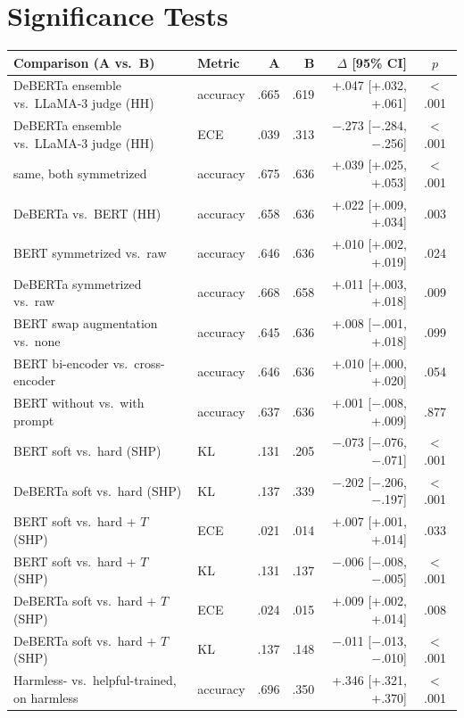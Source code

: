 \documentclass[11pt]{article}
\begin{document}
\section{Significance Tests}
\label{app:significance}

\begin{table}[t]
\centering
\small
\begin{tabular}{llrrrc}
\toprule
Comparison (A vs.\ B) & Metric & A & B & $\Delta$ [95\% CI] & $p$ \\
\midrule
DeBERTa ensemble vs.\ LLaMA-3 judge (HH) & accuracy & .665 & .619 & +.047 [+.032, +.061] & $<$.001 \\
DeBERTa ensemble vs.\ LLaMA-3 judge (HH) & ECE & .039 & .313 & $-$.273 [$-$.284, $-$.256] & $<$.001 \\
same, both symmetrized & accuracy & .675 & .636 & +.039 [+.025, +.053] & $<$.001 \\
DeBERTa vs.\ BERT (HH) & accuracy & .658 & .636 & +.022 [+.009, +.034] & .003 \\
BERT symmetrized vs.\ raw & accuracy & .646 & .636 & +.010 [+.002, +.019] & .024 \\
DeBERTa symmetrized vs.\ raw & accuracy & .668 & .658 & +.011 [+.003, +.018] & .009 \\
BERT swap augmentation vs.\ none & accuracy & .645 & .636 & +.008 [$-$.001, +.018] & .099 \\
BERT bi-encoder vs.\ cross-encoder & accuracy & .646 & .636 & +.010 [+.000, +.020] & .054 \\
BERT without vs.\ with prompt & accuracy & .637 & .636 & +.001 [$-$.008, +.009] & .877 \\
BERT soft vs.\ hard (SHP) & KL & .131 & .205 & $-$.073 [$-$.076, $-$.071] & $<$.001 \\
DeBERTa soft vs.\ hard (SHP) & KL & .137 & .339 & $-$.202 [$-$.206, $-$.197] & $<$.001 \\
BERT soft vs.\ hard + $T$ (SHP) & ECE & .021 & .014 & +.007 [+.001, +.014] & .033 \\
BERT soft vs.\ hard + $T$ (SHP) & KL & .131 & .137 & $-$.006 [$-$.008, $-$.005] & $<$.001 \\
DeBERTa soft vs.\ hard + $T$ (SHP) & ECE & .024 & .015 & +.009 [+.002, +.014] & .008 \\
DeBERTa soft vs.\ hard + $T$ (SHP) & KL & .137 & .148 & $-$.011 [$-$.013, $-$.010] & $<$.001 \\
Harmless- vs.\ helpful-trained, on harmless & accuracy & .696 & .350 & +.346 [+.321, +.370] & $<$.001 \\

\end{tabular}
\end{table}
\end{document}
